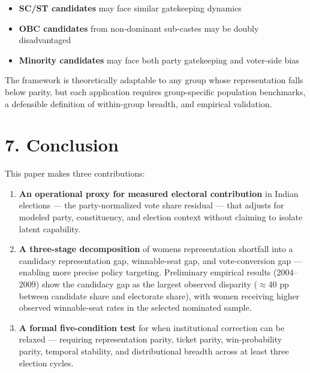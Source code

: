 \documentclass[
]{article}
\providecommand{\tightlist}{%
  \setlength{\itemsep}{0pt}\setlength{\parskip}{0pt}}
\begin{document}
\begin{itemize}
\tightlist
\item
  \textbf{SC/ST candidates} may face similar gatekeeping dynamics
\item
  \textbf{OBC candidates} from non-dominant sub-castes may be doubly disadvantaged
\item
  \textbf{Minority candidates} may face both party gatekeeping and voter-side bias
\end{itemize}

The framework is theoretically adaptable to any group whose representation falls below parity, but each application requires group-specific population benchmarks, a defensible definition of within-group breadth, and empirical validation.

\section{7. Conclusion}\label{7-conclusion}

This paper makes three contributions:

\begin{enumerate}
\def\labelenumi{\arabic{enumi}.}
\item
  \textbf{An operational proxy for measured electoral contribution} in Indian elections --- the party-normalized vote share residual --- that adjusts for modeled party, constituency, and election context without claiming to isolate latent capability.
\item
  \textbf{A three-stage decomposition} of women\textquotesingle s representation shortfall into a candidacy representation gap, winnable-seat gap, and vote-conversion gap --- enabling more precise policy targeting. Preliminary empirical results (2004--2009) show the candidacy gap as the largest observed disparity ($\approx$40 pp between candidate share and electorate share), with women receiving higher observed winnable-seat rates in the selected nominated sample.
\item
  \textbf{A formal five-condition test} for when institutional correction can be relaxed --- requiring representation parity, ticket parity, win-probability parity, temporal stability, and distributional breadth across at least three election cycles.
\end{enumerate}
\end{document}
